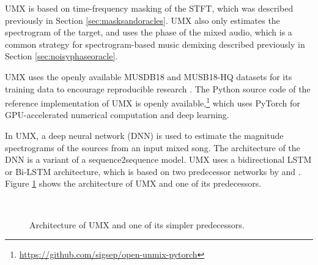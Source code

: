 \documentclass[report.tex]{subfiles}
\begin{document}
UMX is based on time-frequency masking of the STFT, which was described previously in Section \ref{sec:masksandoracles}. UMX also only estimates the spectrogram of the target, and uses the phase of the mixed audio, which is a common strategy for spectrogram-based music demixing described previously in Section \ref{sec:noisyphaseoracle}.

UMX uses the openly available MUSDB18 and MUSB18-HQ datasets for its training data \parencite{musdb18, musdb18hq} to encourage reproducible research \parencite{umx}. The Python source code of the reference implementation of UMX is openly available,\footnote{\url{https://github.com/sigsep/open-unmix-pytorch}} which uses PyTorch \parencite{pytorch} for GPU-accelerated numerical computation and deep learning.

In UMX, a deep neural network (DNN) is used to estimate the magnitude spectrograms of the sources from an input mixed song. The architecture of the DNN is a variant of a sequence2sequence model. UMX uses a bidirectional LSTM or Bi-LSTM architecture, which is based on two predecessor networks by \textcite{umxorig1} and \textcite{umxorig2}. Figure \ref{fig:umxes} shows the architecture of UMX and one of its predecessors.

\begin{figure}[ht]
	\centering
	\\
	\caption{Architecture of UMX and one of its simpler predecessors.}
	\label{fig:umxes}
\end{figure}
\end{document}

